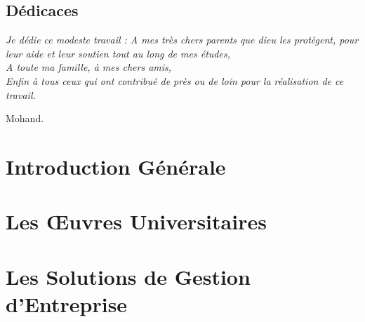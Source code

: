 \documentclass[11pt,a4paper,onecolumn,openright,oneside]{report}
\begin{document}
    \chapter*{\huge Dédicaces}
	
	\begin{center}
		\it \Large
		Je dédie ce modeste travail :
		A mes très chers parents que dieu les
		protègent, pour leur aide et leur soutien tout au long
		de mes études,\\
		
		A toute ma famille, à mes chers amis,\\
		
		Enfin à tous ceux qui ont contribué de près
		ou de loin pour la réalisation de ce travail.\\
		
		\leftskip=12cm
		
		Mohand.
		
		\leftskip=0cm
		
	\end{center}
	
	\tableofcontents
	\listoffigures
	\listoftables

	

	\pagestyle{fancy}
	\fancyhead{}
	
	\renewcommand{\chaptermark}[1]{\markboth{\bsc{\chaptername~\thechapter{} :} #1}{}}
	
	\lhead[\textsl{\rightmark}]{\textsl{\leftmark}}
	
	\renewcommand{\headrulewidth}{1.2pt}
	
	\newcommand\blfootnote[1]{
		\begingroup
		\renewcommand\thefootnote{}\footnote{#1}
		\addtocounter{footnote}{-1}
		\endgroup
	}

	\part*{Introduction Générale}
		

    \part{Les Œuvres Universitaires}
        

	\part{Les Solutions de Gestion d'Entreprise}
        

	
\end{document}
